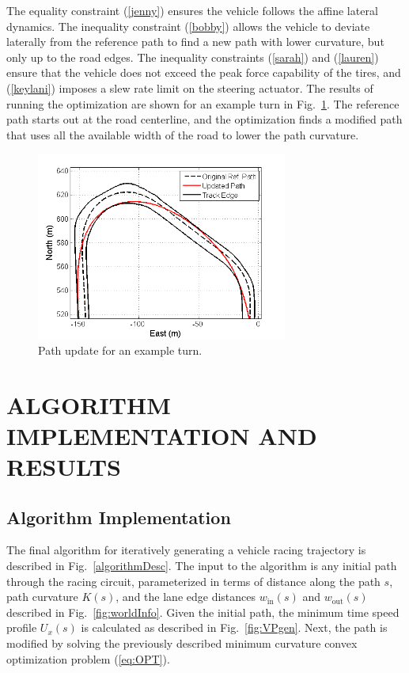 \documentclass[twocolumn,10pt, final]{asme2e}
\begin{document}
The equality constraint (\ref{jenny}) ensures the vehicle follows the affine lateral dynamics. The inequality
 constraint (\ref{bobby}) allows the vehicle to deviate laterally from the reference path to find a new path with lower curvature, but
 only up to the road edges. The inequality constraints (\ref{sarah}) and (\ref{lauren}) ensure that the vehicle does not exceed the peak force
 capability of the tires, and (\ref{keylani}) imposes a slew rate limit on the steering actuator. The results of running the optimization 
 are shown for an example turn in Fig.~\ref{fig:hairpin}. The reference path starts out at the road centerline, and the optimization finds 
 a modified path that uses all the available width of the road to lower the path curvature.
\begin{figure}
\centering
\includegraphics[width=3.25in]{figures/updatedpath.png}
\caption{Path update for an example turn.}
\label{fig:hairpin}
\end{figure}


\section*{ALGORITHM IMPLEMENTATION AND RESULTS}
\subsection*{Algorithm Implementation}
The final algorithm for iteratively
generating a vehicle racing trajectory is described in Fig.~\ref{algorithmDesc}. The input to the algorithm is any initial path through the racing circuit, 
parameterized in terms of distance along the path $s$, path curvature $K(s)$, and the lane edge distances $w_\mathrm{in}(s)$ and 
$w_\mathrm{out}(s)$ described in Fig.~\ref{fig:worldInfo}. Given the initial path, the minimum time speed profile $U_x(s)$ is calculated as described in 
Fig.~\ref{fig:VPgen}. Next, the path is modified by solving the previously described minimum curvature
 convex optimization problem (\ref{eq:OPT}). 
 
\end{document}
